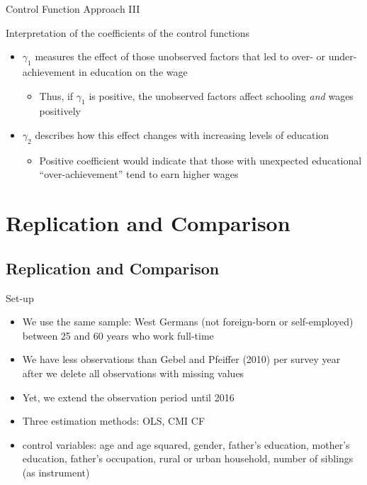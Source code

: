 \documentclass[10pt,ignorenonframetext,]{beamer}
\providecommand{\tightlist}{%
  \setlength{\itemsep}{0pt}\setlength{\parskip}{0pt}}
\begin{document}
\begin{frame}{Control Function Approach III}
\protect\hypertarget{control-function-approach-iii}{}

Interpretation of the coefficients of the control functions

\begin{itemize}
\tightlist
\item
  \(\gamma_1\) measures the effect of those unobserved factors that led
  to over- or under-achievement in education on the wage

  \begin{itemize}
  \tightlist
  \item
    Thus, if \(\gamma_1\) is positive, the unobserved factors affect
    schooling \emph{and} wages positively
  \end{itemize}
\item
  \(\gamma_2\) describes how this effect changes with increasing levels
  of education

  \begin{itemize}
  \tightlist
  \item
    Positive coefficient would indicate that those with unexpected
    educational ``over-achievement'' tend to earn higher wages
  \end{itemize}
\end{itemize}

\end{frame}

\hypertarget{replication-and-comparison}{%
\section{Replication and Comparison}\label{replication-and-comparison}}

\hypertarget{replication-and-comparison-1}{%
\subsection{Replication and
Comparison}\label{replication-and-comparison-1}}

\begin{frame}{Set-up}
\protect\hypertarget{set-up}{}

\begin{itemize}
\tightlist
\item
  We use the same sample: West Germans (not foreign-born or
  self-employed) between 25 and 60 years who work full-time
\item
  We have less observations than Gebel and Pfeiffer (2010) per survey
  year after we delete all observations with missing values
\item
  Yet, we extend the observation period until 2016
\item
  Three estimation methods: OLS, CMI CF
\item
  control variables: age and age squared, gender, father's education,
  mother's education, father's occupation, rural or urban household,
  number of siblings (as instrument)
\end{itemize}

\end{frame}
\end{document}
